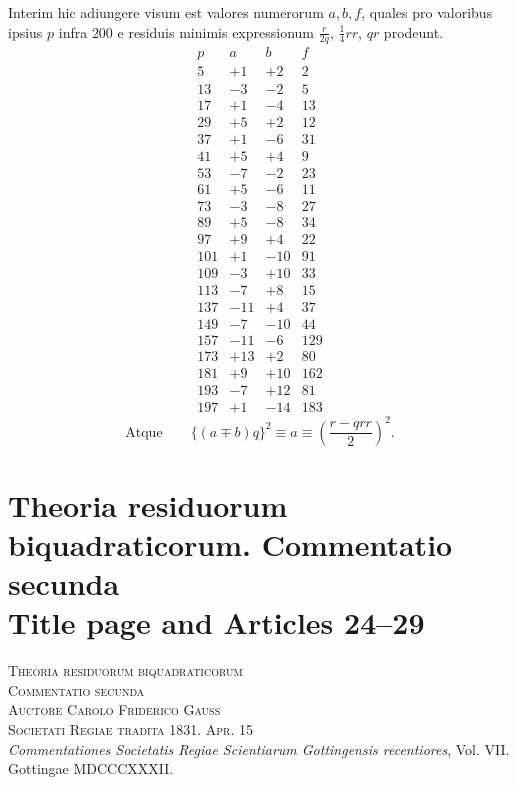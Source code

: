 \documentclass[12pt]{article}
\begin{document}
Interim hic adiungere visum est valores numerorum $a,b,f$, quales pro valoribus ipsius $p$ infra $200$ e residuis minimis expressionum $\frac{r}{2q}$, $\frac14rr$, $qr$ prodeunt.
\[
\begin{array}{r|r|r|r}
p&a&b&f\\\hline
5&+1&+2&2\\
13&-3&-2&5\\
17&+1&-4&13\\
29&+5&+2&12\\
37&+1&-6&31\\
41&+5&+4&9\\
53&-7&-2&23\\
61&+5&-6&11\\
73&-3&-8&27\\
89&+5&-8&34\\
97&+9&+4&22\\
101&+1&-10&91\\
109&-3&+10&33\\
113&-7&+8&15\\
137&-11&+4&37\\
149&-7&-10&44\\
157&-11&-6&129\\
173&+13&+2&80\\
181&+9&+10&162\\
193&-7&+12&81\\
197&+1&-14&183
\end{array}
\]
\[
\text{Atque}\qquad \{(a\mp b)q\}^2\equiv a\equiv \left(\frac{r-qrr}{2}\right)^2.
\]



\section*{Theoria residuorum biquadraticorum. Commentatio secunda\\
Title page and Articles 24--29}

\begin{center}
\textsc{Theoria residuorum biquadraticorum}\\
\textsc{Commentatio secunda}\\[2pt]
\textsc{Auctore Carolo Friderico Gauss}\\
\textsc{Societati Regiae tradita 1831. Apr. 15}\\
\emph{Commentationes Societatis Regiae Scientiarum Gottingensis recentiores}, Vol. VII.\\
Gottingae MDCCCXXXII.
\end{center}
\end{document}
